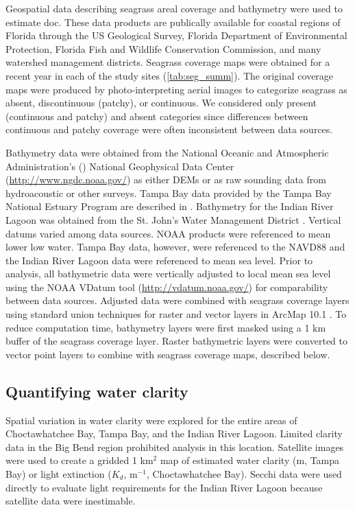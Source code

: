 \documentclass[letterpaper,12pt,oneside]{article}\usepackage[]{graphicx}\usepackage[]{color}
\begin{document}
Geospatial data describing seagrass areal coverage and bathymetry were used to estimate \ac{doc}.  These data products are publically available for coastal regions of Florida through the US Geological Survey, Florida Department of Environmental Protection, Florida Fish and Wildlife Conservation Commission, and many watershed management districts.  Seagrass coverage maps were obtained for a recent year in each of the study sites (\cref{tab:seg_summ}).  The original coverage maps were produced by photo-interpreting aerial images to categorize seagrass as absent, discontinuous (patchy), or continuous.  We considered only present (continuous and patchy) and absent categories since differences between continuous and patchy coverage were often inconsistent between data sources. 

Bathymetry data were obtained from the National Oceanic and Atmospheric Administration's () National Geophysical Data Center (\url{http://www.ngdc.noaa.gov/}) as either \acp{DEM} or as raw sounding data from hydroacoustic or other surveys.  Tampa Bay data provided by the Tampa Bay National Estuary Program are described in \citet{Tyler07}. Bathymetry for the Indian River Lagoon was obtained from the St. John's Water Management District \citep{CPE97}.  Vertical datums varied among data sources. \ac{NOAA} products were referenced to mean lower low water. Tampa Bay data, however, were referenced to the \ac{NAVD88} and the Indian River Lagoon data were referenced to mean sea level.  Prior to analysis, all bathymetric data were vertically adjusted to local mean sea level using the \ac{NOAA} VDatum tool (\url{http://vdatum.noaa.gov/}) for comparability between data sources. Adjusted data were combined with seagrass coverage layers using standard union techniques for raster and vector layers in ArcMap 10.1 \citep{ESRI12}.  To reduce computation time, bathymetry layers were first masked using a 1 km buffer of the seagrass coverage layer.  Raster bathymetric layers were converted to vector point layers to combine with seagrass coverage maps, described below.  

\subsection{Quantifying water clarity} \label{sec:clar_est}

Spatial variation in water clarity were explored for the entire areas of Choctawhatchee Bay, Tampa Bay, and the Indian River Lagoon. Limited clarity data in the Big Bend region prohibited analysis in this location.  Satellite images were used to create a gridded 1 km$^2$ map of estimated water clarity (m, Tampa Bay) or light extinction ($K_d$, m$^{-1}$, Choctawhatchee Bay).  Secchi data were used directly to evaluate light requirements for the Indian River Lagoon because satellite data were inestimable.
\end{document}
